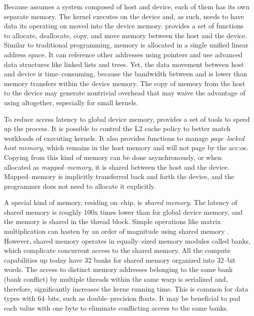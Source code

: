 Because \cuda assumes a system composed of host and device, each of them has its own separate memory. The kernel executes on the device and, as such, needs to have data its operating on moved into the device memory. \cuda provides a set of functions to allocate, deallocate, copy, and move memory between the host and the device. Similar to traditional \cpp programming, \cuda memory is allocated in a single unified linear address space. It can reference other addresses using pointers and use advanced data structures like linked lists and trees. Yet, the data movement between host and device is time--consuming, because the bandwidth between \cpu and \gpu is lower than memory transfers within the device memory. The copy of memory from the host to the device may generate nontrivial overhead that may waive the advantage of using \gpu altogether, especially for small kernels. 

To reduce access latency to global device memory, \cuda provides a set of tools to speed up the process. It is possible to control the L2 cache policy to better match workloads of executing kernels. It also provides functions to manage \emph{page--locked host memory}, which remains in the host memory and will not page by the \acrshort{acc:os}. Copying from this kind of memory can be done asynchronously, or when allocated as \emph{mapped--memory}, it is shared between the host and the device. Mapped--memory is implicitly transferred back and forth the device, and the programmer does not need to allocate it explicitly.

A special kind of memory, residing on--chip, is \emph{shared memory}. The latency of shared memory is roughly 100x times lower than for global device memory, and the memory is shared in the thread block. Simple operations like matrix multiplication can hasten by an order of magnitude using shared memory \citep{MatrixMultiplicationGPU}. However, shared memory operates in equally--sized memory modules called banks, which complicate concurrent access to the shared memory. All the compute capabilities up today have 32 banks for shared memory organized into 32--bit words. The access to distinct memory addresses belonging to the same bank (bank conflict) by multiple threads within the same warp is serialized and, therefore, significantly increases the kerne running time. This is common for data types with 64--bits, such as double--precision floats. It may be beneficial to pad each value with one byte to eliminate conflicting access to the same banks.

